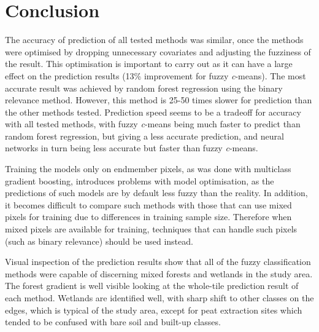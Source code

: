 \documentclass[a4paper,10pt]{book}
\begin{document}
\chapter{Conclusion}

The accuracy of prediction of all tested methods was similar, once the methods were optimised by dropping unnecessary covariates and adjusting the fuzziness of the result. This optimisation is important to carry out as it can have a large effect on the prediction results (13\% improvement for fuzzy \textit{c}-means). The most accurate result was achieved by random forest regression using the binary relevance method. However, this method is 25-50 times slower for prediction than the other methods tested. Prediction speed seems to be a tradeoff for accuracy with all tested methods, with fuzzy \textit{c}-means being much faster to predict than random forest regression, but giving a less accurate prediction, and neural networks in turn being less accurate but faster than fuzzy \textit{c}-means.

Training the models only on endmember pixels, as was done with multiclass gradient boosting, introduces problems with model optimisation, as the predictions of such models are by default less fuzzy than the reality. In addition, it becomes difficult to compare such methods with those that can use mixed pixels for training due to differences in training sample size. Therefore when mixed pixels are available for training, techniques that can handle such pixels (such as binary relevance) should be used instead.

Visual inspection of the prediction results show that all of the fuzzy classification methods were capable of discerning mixed forests and wetlands in the study area. The forest gradient is well visible looking at the whole-tile prediction result of each method. Wetlands are identified well, with sharp shift to other classes on the edges, which is typical of the study area, except for peat extraction sites which tended to be confused with bare soil and built-up classes.


\end{document}
